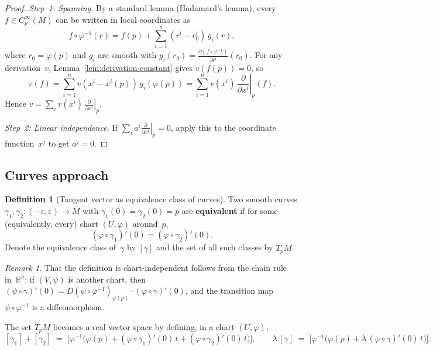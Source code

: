 \documentclass[12pt,a4paper,openany]{book}
\theoremstyle{definition}
\newtheorem{definition}[theorem]{Definition}
\theoremstyle{remark}
\newtheorem{remark}[theorem]{Remark}
\newcommand{\R}{\mathbb{R}}
\begin{document}
\begin{proof}
\emph{Step~1: Spanning.}
By a standard lemma (Hadamard's lemma), every
$f \in C^\infty_p(M)$ can be written in local coordinates as
\[
  f \circ \varphi^{-1}(r)
  = f(p) + \sum_{i=1}^{n} (r^i - r^i_0)\, g_i(r),
\]
where $r_0 = \varphi(p)$ and $g_i$ are smooth with
$g_i(r_0) = \frac{\partial(f \circ \varphi^{-1})}{\partial r^i}(r_0)$.
For any derivation~$v$, Lemma~\ref{lem:derivation-constant} gives
$v(f(p)) = 0$, so
\[
  v(f) = \sum_{i=1}^{n} v(x^i - x^i(p))\, g_i(\varphi(p))
  = \sum_{i=1}^{n} v(x^i)\,
  \left.\frac{\partial}{\partial x^i}\right|_p(f).
\]
Hence $v = \sum_i v(x^i)\, \left.\frac{\partial}{\partial x^i}\right|_p$.

\emph{Step~2: Linear independence.}
If $\sum_i a^i \left.\frac{\partial}{\partial x^i}\right|_p = 0$, apply
this to the coordinate function~$x^j$ to get $a^j = 0$.
\end{proof}

\subsection{Curves approach}\label{ssec:curves}

\begin{definition}[Tangent vector as equivalence class of curves]%
\label{def:tangent-curve}
Two smooth curves $\gamma_1, \gamma_2 \colon (-\varepsilon, \varepsilon) \to M$
with $\gamma_1(0) = \gamma_2(0) = p$ are \textbf{equivalent} if for some
(equivalently, every) chart $(U, \varphi)$ around~$p$,
\[
  (\varphi \circ \gamma_1)'(0) = (\varphi \circ \gamma_2)'(0).
\]
Denote the equivalence class of~$\gamma$ by $[\gamma]$ and the set of all
such classes by $\widetilde{T}_pM$.
\end{definition}

\begin{remark}\label{rem:chart-independence-curves}
That the definition is chart-independent follows from the chain rule
in~$\R^n$: if $(V, \psi)$ is another chart, then
$(\psi \circ \gamma)'(0) = D(\psi \circ \varphi^{-1})_{\varphi(p)}
\cdot (\varphi \circ \gamma)'(0)$, and the transition map
$\psi \circ \varphi^{-1}$ is a diffeomorphism.
\end{remark}

The set $\widetilde{T}_pM$ becomes a real vector space by defining, in a
chart $(U, \varphi)$,
\[
  [\gamma_1] + [\gamma_2]
  \;=\; \bigl[\varphi^{-1}\bigl(\varphi(p)
    + (\varphi \circ \gamma_1)'(0)\,t
    + (\varphi \circ \gamma_2)'(0)\,t\bigr)\bigr],
  \qquad
  \lambda\,[\gamma] \;=\;
  \bigl[\varphi^{-1}\bigl(\varphi(p)
    + \lambda\,(\varphi \circ \gamma)'(0)\,t\bigr)\bigr].
\]
\end{document}
